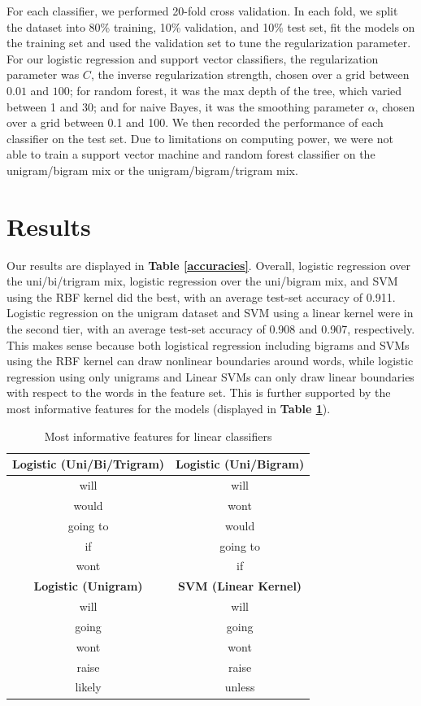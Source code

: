 \documentclass[11pt,letterpaper]{article}
\begin{document}
For each classifier, we performed 20-fold cross validation. In each fold, we split the dataset into  80\% training, 10\% validation, and 10\% test set, fit the models on the training set and used the validation set to tune the regularization parameter. For our logistic regression and support vector classifiers, the regularization parameter was $C$, the inverse regularization strength, chosen over a grid between $0.01$ and $100$; for random forest, it was the max depth of the tree, which varied between 1 and 30; and for naive Bayes, it was the smoothing parameter $\alpha$, chosen over a grid between 0.1 and 100. We then recorded the performance of each classifier on the test set. Due to limitations on computing power, we were not able to train a support vector machine and random forest classifier on the unigram/bigram mix or the unigram/bigram/trigram mix.

\section{Results}
\label{results}
Our results are displayed in \textbf{Table \ref{accuracies}}. Overall, logistic regression over the uni/bi/trigram mix, logistic regression over the uni/bigram mix, and SVM using the RBF kernel did the best, with an average test-set accuracy of 0.911. Logistic regression on the unigram dataset and SVM using a linear kernel were in the second tier, with an average test-set accuracy of 0.908 and 0.907, respectively. This makes sense because both logistical regression including bigrams and SVMs using the RBF kernel can draw nonlinear boundaries around words, while logistic regression using only unigrams and Linear SVMs can only draw linear boundaries with respect to the words in the feature set. This is further supported by the most informative features for the models (displayed in \textbf{Table \ref{features}}). 

\begin{table}
\centering
 \begin{tabular}{|c | c|} 
 \hline
\textbf{Logistic (Uni/Bi/Trigram)} & \textbf{Logistic (Uni/Bigram)}  \\
 \hline
will & will\\
would & wont \\
going to & would \\
if & going to \\
wont & if\\
 \hline
 \hline
\textbf{Logistic (Unigram)} & \textbf{SVM (Linear Kernel)}  \\
 \hline
will & will\\
going & going\\
wont & wont\\
raise & raise\\
likely & unless\\
 \hline
 \end{tabular}
 \caption{Most informative features for linear classifiers}
 \label{features}
\end{table}
\end{document}
